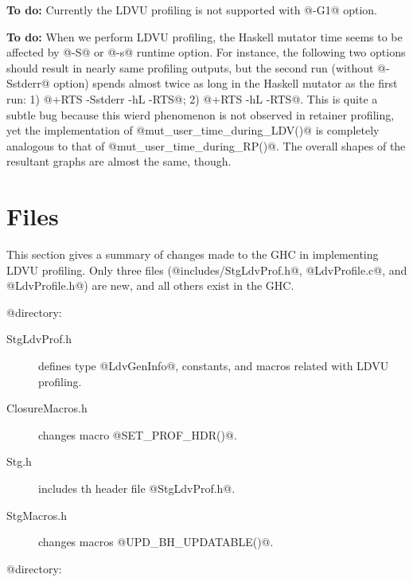 \documentclass{article}
\begin{document}
\textbf{To do:} Currently the LDVU profiling is not supported with @-G1@ option.

\textbf{To do:} When we perform LDVU profiling, the Haskell mutator time seems to
be affected by @-S@ or @-s@ runtime option. For instance, the following 
two options should result in nearly same profiling outputs, but
the second run (without @-Sstderr@ option) spends almost twice as
long in the Haskell mutator as the first run:
1) @+RTS -Sstderr -hL -RTS@; 2) @+RTS -hL -RTS@.
This is quite a subtle bug because this wierd phenomenon is not 
observed in retainer profiling, yet the implementation of 
@mut_user_time_during_LDV()@ is completely analogous to that of 
@mut_user_time_during_RP()@. The overall shapes of the resultant graphs 
are almost the same, though.

\section{Files}

This section gives a summary of changes made to the GHC in 
implementing LDVU profiling.
Only three files (@includes/StgLdvProf.h@, @LdvProfile.c@, and 
@LdvProfile.h@) are new, and all others exist in the GHC.

@ directory:

\begin{description}
\item[StgLdvProf.h] defines type @LdvGenInfo@, constants, and macros related
with LDVU profiling.
\item[ClosureMacros.h] changes macro @SET_PROF_HDR()@.
\item[Stg.h] includes th header file @StgLdvProf.h@.
\item[StgMacros.h] changes macros @UPD_BH_UPDATABLE()@.
\end{description}

@\rts@ directory:
\end{document}
